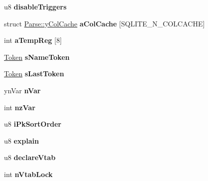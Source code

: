 \begin{DoxyCompactItemize}
\item 
u8 {\bfseries disable\+Triggers}\hypertarget{structParse_a5ea9b658f4cfacf4b35f18c51e144ef1}{}\label{structParse_a5ea9b658f4cfacf4b35f18c51e144ef1}

\item 
struct \hyperlink{structParse_1_1yColCache}{Parse\+::y\+Col\+Cache} {\bfseries a\+Col\+Cache} \mbox{[}S\+Q\+L\+I\+T\+E\+\_\+\+N\+\_\+\+C\+O\+L\+C\+A\+C\+HE\mbox{]}\hypertarget{structParse_a788b85979d58b84e06bc367bac5b3f3f}{}\label{structParse_a788b85979d58b84e06bc367bac5b3f3f}

\item 
int {\bfseries a\+Temp\+Reg} \mbox{[}8\mbox{]}\hypertarget{structParse_ae2bd2e74d0caaab7a741d17b62f01ebc}{}\label{structParse_ae2bd2e74d0caaab7a741d17b62f01ebc}

\item 
\hyperlink{structToken}{Token} {\bfseries s\+Name\+Token}\hypertarget{structParse_afd929c54566cfc4d6f748fcc6b79b973}{}\label{structParse_afd929c54566cfc4d6f748fcc6b79b973}

\item 
\hyperlink{structToken}{Token} {\bfseries s\+Last\+Token}\hypertarget{structParse_ad499020d1bf06f3c98c8d36e2ceb83fd}{}\label{structParse_ad499020d1bf06f3c98c8d36e2ceb83fd}

\item 
yn\+Var {\bfseries n\+Var}\hypertarget{structParse_ae529f84d792c36e3f474e2ff89f0b6e4}{}\label{structParse_ae529f84d792c36e3f474e2ff89f0b6e4}

\item 
int {\bfseries nz\+Var}\hypertarget{structParse_ac9cf894d9dfd0ba37d9467cd9d2e48f0}{}\label{structParse_ac9cf894d9dfd0ba37d9467cd9d2e48f0}

\item 
u8 {\bfseries i\+Pk\+Sort\+Order}\hypertarget{structParse_a2be71f432ab79d2db44f1fcbbce55488}{}\label{structParse_a2be71f432ab79d2db44f1fcbbce55488}

\item 
u8 {\bfseries explain}\hypertarget{structParse_a41f7ea55f0d6523295a5d958e25a2787}{}\label{structParse_a41f7ea55f0d6523295a5d958e25a2787}

\item 
u8 {\bfseries declare\+Vtab}\hypertarget{structParse_a86c869df65cd788025680de9b6a9b1f1}{}\label{structParse_a86c869df65cd788025680de9b6a9b1f1}

\item 
int {\bfseries n\+Vtab\+Lock}\hypertarget{structParse_a7db8fe1ce2f0ec6bda7dc729a0e6a6e3}{}\label{structParse_a7db8fe1ce2f0ec6bda7dc729a0e6a6e3}


\end{DoxyCompactItemize}
